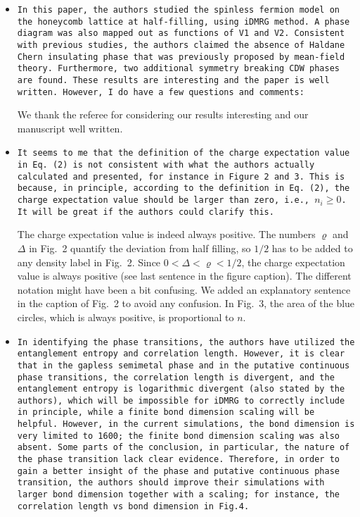 \documentclass[aps,prb,superscriptaddress]{revtex4}
\begin{document}
\begin{itemize}

\item{\tt In this paper, the authors studied the spinless fermion model on the
honeycomb lattice at half-filling, using iDMRG method. A phase diagram
was also mapped out as functions of V1 and V2. Consistent with
previous studies, the authors claimed the absence of Haldane Chern
insulating phase that was previously proposed by mean-field theory.
Furthermore, two additional symmetry breaking CDW phases are found.
These results are interesting and the paper is well written. However,
I do have a few questions and comments:}

We thank the referee for considering our results interesting and our manuscript well written.

\item{\tt It seems to me that the definition of the charge expectation value
in Eq. (2) is not consistent with what the authors actually calculated
and presented, for instance in Figure 2 and 3. This is because, in
principle, according to the definition in Eq. (2), the charge
expectation value should be larger than zero, i.e., $n_i \geq 0$. It will be
great if the authors could clarify this.}

The charge expectation value is indeed always positive. The numbers $\varrho$ and $\Delta$ in Fig.~2 quantify the deviation from half filling, so $1/2$ has to be added to any density label in Fig.~2. Since $0<\Delta<\varrho<1/2$, the charge expectation value is always positive (see last sentence in the figure caption). The different notation might have been a bit confusing. We added an explanatory sentence in the caption of Fig.~2 to avoid any confusion. In Fig.~3, the area of the blue circles, which is always positive, is proportional to $n$.

\item{\tt In identifying the phase transitions, the authors have utilized the
entanglement entropy and correlation length. However, it is clear that
in the gapless semimetal phase and in the putative continuous phase
transitions, the correlation length is divergent, and the entanglement
entropy is logarithmic divergent (also stated by the authors), which
will be impossible for iDMRG to correctly include in principle, while
a finite bond dimension scaling will be helpful. However, in the
current simulations, the bond dimension is very limited to 1600; the
finite bond dimension scaling was also absent. Some parts of the
conclusion, in particular, the nature of the phase transition lack
clear evidence. Therefore, in order to gain a better insight of the
phase and putative continuous phase transition, the authors should
improve their simulations with larger bond dimension together with a
scaling; for instance, the correlation length vs bond dimension in
Fig.4.}


\end{itemize}
\end{document}
